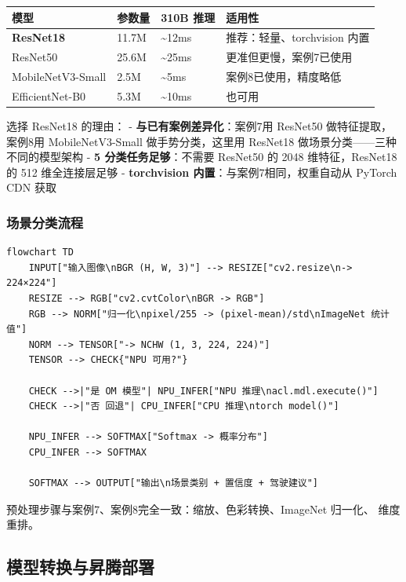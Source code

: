 \begin{longtable}[]{@{}llll@{}}
\toprule\noalign{}
模型 & 参数量 & 310B 推理 & 适用性 \\
\midrule\noalign{}
\endhead
\bottomrule\noalign{}
\endlastfoot
\textbf{ResNet18} & 11.7M & \textasciitilde12ms &
推荐：轻量、torchvision 内置 \\
ResNet50 & 25.6M & \textasciitilde25ms & 更准但更慢，案例7已使用 \\
MobileNetV3-Small & 2.5M & \textasciitilde5ms & 案例8已使用，精度略低 \\
EfficientNet-B0 & 5.3M & \textasciitilde10ms & 也可用 \\
\end{longtable}

选择 ResNet18 的理由： - \textbf{与已有案例差异化}：案例7用 ResNet50
做特征提取，案例8用 MobileNetV3-Small 做手势分类，这里用 ResNet18
做场景分类------三种 不同的模型架构 - \textbf{5 分类任务足够}：不需要
ResNet50 的 2048 维特征，ResNet18 的 512 维全连接层足够 -
\textbf{torchvision 内置}：与案例7相同，权重自动从 PyTorch CDN 获取

\subsubsection{场景分类流程}\label{src-experiment-case6-h14}

\begin{lstlisting}
flowchart TD
    INPUT["输入图像\nBGR (H, W, 3)"] --> RESIZE["cv2.resize\n-> 224×224"]
    RESIZE --> RGB["cv2.cvtColor\nBGR -> RGB"]
    RGB --> NORM["归一化\npixel/255 -> (pixel-mean)/std\nImageNet 统计值"]
    NORM --> TENSOR["-> NCHW (1, 3, 224, 224)"]
    TENSOR --> CHECK{"NPU 可用?"}

    CHECK -->|"是 OM 模型"| NPU_INFER["NPU 推理\nacl.mdl.execute()"]
    CHECK -->|"否 回退"| CPU_INFER["CPU 推理\ntorch model()"]

    NPU_INFER --> SOFTMAX["Softmax -> 概率分布"]
    CPU_INFER --> SOFTMAX

    SOFTMAX --> OUTPUT["输出\n场景类别 + 置信度 + 驾驶建议"]
\end{lstlisting}

预处理步骤与案例7、案例8完全一致：缩放、色彩转换、ImageNet 归一化、
维度重排。

\subsection{模型转换与昇腾部署}\label{src-experiment-case6-h15}


